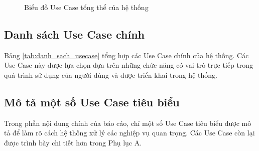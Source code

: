 \documentclass[12pt, a4paper]{report}
\begin{document}
\begin{figure}[htbp]
{
    }
    \caption{Biểu đồ Use Case tổng thể của hệ thống}
    \label{fig:usecase_tong_the}
\end{figure}

\subsection{Danh sách Use Case chính}Bảng \ref{tab:danh_sach_usecase} tổng hợp các Use Case chính của hệ thống. Các Use Case này được lựa chọn dựa trên những chức năng có vai trò trực tiếp trong quá trình sử dụng của người dùng và được triển khai trong hệ thống.

\subsection{Mô tả một số Use Case tiêu biểu}Trong phần nội dung chính của báo cáo, chỉ một số Use Case tiêu biểu được mô tả để làm rõ cách hệ thống xử lý các nghiệp vụ quan trọng. Các Use Case còn lại được trình bày chi tiết hơn trong Phụ lục A.
\end{document}
